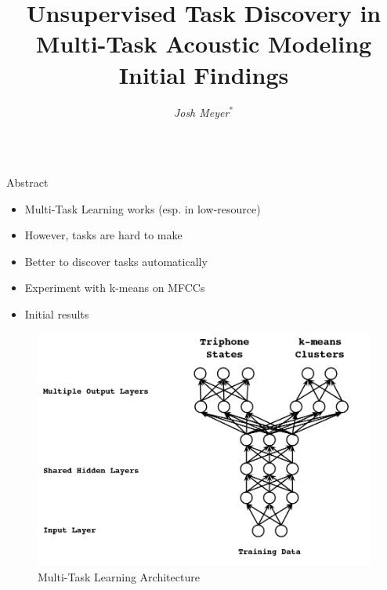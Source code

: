 \documentclass[final]{beamer} %
\title{Unsupervised Task Discovery in Multi-Task Acoustic Modeling \\ \vspace{0.3em} Initial Findings}
\author{
  \textit{Josh Meyer}$^*$}
\institute{$*$ University of Arizona}
\newlength{\columnheight}
\begin{document}


\begin{frame}
  \begin{columns}
    \begin{column}{0.22\textwidth}
      \parbox[t][\columnheight]{.9\textwidth}{
        \begin{block}{Abstract}
          \begin{itshape}   %
            \begin{itemize}
            \item Multi-Task Learning works (esp. in low-resource)
            \item However, tasks are hard to make
            \item Better to discover tasks automatically
            \item Experiment with k-means on MFCCs
            \item Initial results
            \end{itemize}
          \end{itshape}
        \end{block}

        \vspace{.5cm}

        \begin{figure}[!htbp]
          \centering
          \includegraphics[width=\linewidth]{figs/heigold-2013-dnn-c.png}
          \caption{Multi-Task Learning Architecture}
          \label{fig:mtl-dnn}
          \endminipage\hfill
        \end{figure}
        
}
\end{column}
\end{columns}
\end{frame}
\end{document}
